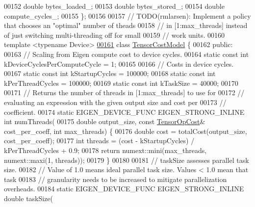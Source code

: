 \begin{DoxyCode}
00152   \textcolor{keywordtype}{double} bytes\_loaded\_;
00153   \textcolor{keywordtype}{double} bytes\_stored\_;
00154   \textcolor{keywordtype}{double} compute\_cycles\_;
00155 \};
00156 
00157 \textcolor{comment}{// TODO(rmlarsen): Implement a policy that chooses an "optimal" number of theads}
00158 \textcolor{comment}{// in [1:max\_threads] instead of just switching multi-threading off for small}
00159 \textcolor{comment}{// work units.}
00160 \textcolor{keyword}{template} <\textcolor{keyword}{typename} Device>
\hyperlink{class_eigen_1_1_tensor_cost_model}{00161} \textcolor{keyword}{class }\hyperlink{class_eigen_1_1_tensor_cost_model}{TensorCostModel} \{
00162  \textcolor{keyword}{public}:
00163   \textcolor{comment}{// Scaling from Eigen compute cost to device cycles.}
00164   \textcolor{keyword}{static} \textcolor{keyword}{const} \textcolor{keywordtype}{int} kDeviceCyclesPerComputeCycle = 1;
00165 
00166  \textcolor{comment}{// Costs in device cycles.}
00167   \textcolor{keyword}{static} \textcolor{keyword}{const} \textcolor{keywordtype}{int} kStartupCycles = 100000;
00168   \textcolor{keyword}{static} \textcolor{keyword}{const} \textcolor{keywordtype}{int} kPerThreadCycles = 100000;
00169   \textcolor{keyword}{static} \textcolor{keyword}{const} \textcolor{keywordtype}{int} kTaskSize = 40000;
00170 
00171   \textcolor{comment}{// Returns the number of threads in [1:max\_threads] to use for}
00172   \textcolor{comment}{// evaluating an expression with the given output size and cost per}
00173   \textcolor{comment}{// coefficient.}
00174   \textcolor{keyword}{static} EIGEN\_DEVICE\_FUNC EIGEN\_STRONG\_INLINE \textcolor{keywordtype}{int} numThreads(
00175       \textcolor{keywordtype}{double} output\_size, \textcolor{keyword}{const} \hyperlink{class_eigen_1_1_tensor_op_cost}{TensorOpCost}& cost\_per\_coeff, \textcolor{keywordtype}{int} max\_threads) \{
00176     \textcolor{keywordtype}{double} cost = totalCost(output\_size, cost\_per\_coeff);
00177     \textcolor{keywordtype}{int} threads = (cost - kStartupCycles) / kPerThreadCycles + 0.9;
00178     \textcolor{keywordflow}{return} numext::mini(max\_threads, numext::maxi(1, threads));
00179   \}
00180 
00181   \textcolor{comment}{// taskSize assesses parallel task size.}
00182   \textcolor{comment}{// Value of 1.0 means ideal parallel task size. Values < 1.0 mean that task}
00183   \textcolor{comment}{// granularity needs to be increased to mitigate parallelization overheads.}
00184   \textcolor{keyword}{static} EIGEN\_DEVICE\_FUNC EIGEN\_STRONG\_INLINE \textcolor{keywordtype}{double} taskSize(

\end{DoxyCode}
